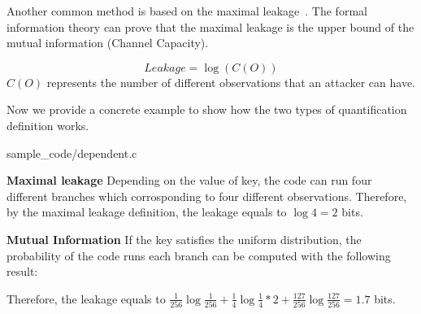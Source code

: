 Another common method is based on the maximal leakage~\cite{10.1007/978-3-642-00596-1_21,10.1007/978-3-642-31424-7_40,182946}.
The formal information theory can prove that the maximal leakage is the upper bound of the mutual 
information (Channel Capacity).

\begin{displaymath}
    \mathit{Leakage} = \log(C(O))
\end{displaymath}
$C(O)$ represents the number of different observations that an attacker can have. 

Now we provide a concrete example to show how the two types of quantification definition works.


                 {sample_code/dependent.c}

\textbf{Maximal leakage} 
Depending on the value of key, the code can run four different branches which corrosponding to 
four different observations. Therefore, by the maximal leakage definition, the leakage equals to 
$\log4 = 2$ bits.

\textbf{Mutual Information} If the key satisfies the uniform distribution, the probability of the code runs each branch
can be computed with the following result: 
\begin{table}[h]
\centering
{}
\caption{The distribution of observations}
\end{table}
Therefore, the leakage equals to 
$\frac{1}{256}\log\frac{1}{256} + \frac{1}{4}\log\frac{1}{4}*2 + \frac{127}{256}\log\frac{127}{256} = 1.7$ bits.

